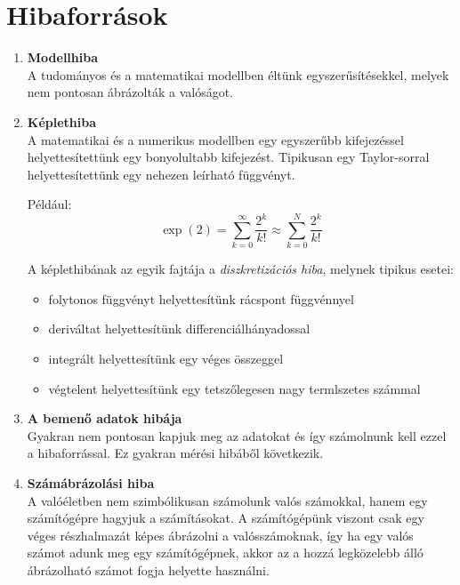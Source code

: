 \section{Hibaforrások}
\begin{enumerate}
    \item \textbf{Modellhiba} \\
    A tudományos és a matematikai modellben éltünk egyszerűsítésekkel, melyek nem pontosan ábrázolták a valóságot.

    \item \textbf{Képlethiba} \\
    A matematikai és a numerikus modellben egy egyszerűbb kifejezéssel helyettesítettünk egy bonyolultabb kifejezést. Tipikusan egy Taylor-sorral helyettesítettünk egy nehezen leírható függvényt.
    
    Például:
    \begin{equation*}
        \exp(2) = \sum_{k=0}^{\infty} \frac{2^{k}}{k!} \approx \sum_{k=0}^{N} \frac{2^{k}}{k!}
    \end{equation*}

    A képlethibának az egyik fajtája a \textit{diszkretizációs hiba}, melynek tipikus esetei:
    \begin{itemize}
        \item folytonos függvényt helyettesítünk rácspont függvénnyel
        \item deriváltat helyettesítünk differenciálhányadossal
        \item integrált helyettesítünk egy véges összeggel
        \item végtelent helyettesítünk egy tetszőlegesen nagy termlszetes számmal
    \end{itemize}

    \item \textbf{A bemenő adatok hibája} \\
    Gyakran nem pontosan kapjuk meg az adatokat és így számolnunk kell ezzel a hibaforrással. Ez gyakran mérési hibáből következik.

    \item \textbf{Számábrázolási hiba} \\
    A valóéletben nem szimbólikusan számolunk valós számokkal, hanem egy számítógépre hagyjuk a számításokat. A számítógépünk viszont csak egy véges részhalmazát képes ábrázolni a valósszámoknak, így ha egy valós számot adunk meg egy számítógépnek, akkor az a hozzá legközelebb álló ábrázolható számot fogja helyette használni.
\end{enumerate}

